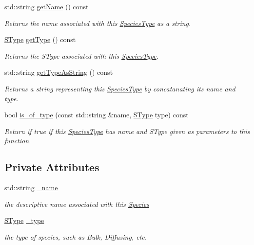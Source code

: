 \begin{DoxyCompactItemize}
std\-::string \hyperlink{group__Chemistry_gaaf0a4e87ff04118e9b0413bbc26790bb}{get\-Name} () const 
\begin{DoxyCompactList}\small\item\em Returns the name associated with this \hyperlink{classSpeciesType}{Species\-Type} as a string. \end{DoxyCompactList}\item 
\hyperlink{group__Chemistry_ga49104ff0a7d4118feb179c2f1c906f12}{S\-Type} \hyperlink{group__Chemistry_ga32c3dcca6d25d7b1f99abcd33de42019}{get\-Type} () const 
\begin{DoxyCompactList}\small\item\em Returns the S\-Type associated with this \hyperlink{classSpeciesType}{Species\-Type}. \end{DoxyCompactList}\item 
std\-::string \hyperlink{group__Chemistry_gaf24d4e26a72d86c37c86d5c9ce81b5b5}{get\-Type\-As\-String} () const 
\begin{DoxyCompactList}\small\item\em Returns a string representing this \hyperlink{classSpeciesType}{Species\-Type} by concatanating its name and type. \end{DoxyCompactList}\item 
bool \hyperlink{group__Chemistry_ga3af85abdd52aa7e25a1e8321b0fd3cdf}{is\-\_\-of\-\_\-type} (const std\-::string \&name, \hyperlink{group__Chemistry_ga49104ff0a7d4118feb179c2f1c906f12}{S\-Type} type) const 
\begin{DoxyCompactList}\small\item\em Return if true if this \hyperlink{classSpeciesType}{Species\-Type} has name and S\-Type given as parameters to this function. \end{DoxyCompactList}\end{DoxyCompactItemize}
\subsection*{Private Attributes}
\begin{DoxyCompactItemize}
\item 
std\-::string \hyperlink{group__Chemistry_gac062140ac4d8e0b7d2e0b8e934a9cb9d}{\-\_\-name}
\begin{DoxyCompactList}\small\item\em the descriptive name associated with this \hyperlink{classSpecies}{Species} \end{DoxyCompactList}\item 
\hyperlink{group__Chemistry_ga49104ff0a7d4118feb179c2f1c906f12}{S\-Type} \hyperlink{group__Chemistry_ga5acc1777425b096830e64a4e5080afbc}{\-\_\-type}
\begin{DoxyCompactList}\small\item\em the type of species, such as Bulk, Diffusing, etc. \end{DoxyCompactList}\end{DoxyCompactItemize}
